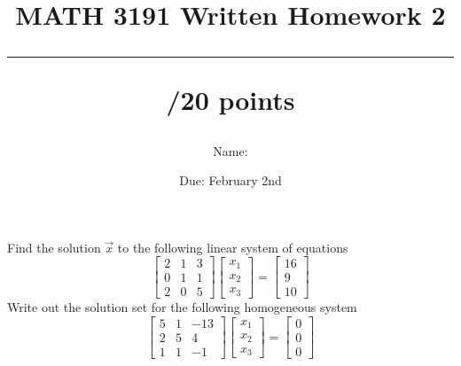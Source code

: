 \documentclass{exam}
\title{MATH 3191 Written Homework 2\\\rule{30pt}{1pt}/20 points}
\author{Name: \rule{150pt}{1pt}}
\date{Due: February 2nd}
\begin{document}
\maketitle
\begin{questions}
\question[10]
    Find the solution $\vec{x}$ to the following linear system of equations
    \[
        \begin{bmatrix}
            2 & 1 & 3\\
            0 & 1 & 1\\
            2 & 0 & 5
        \end{bmatrix}\begin{bmatrix}
            x_1 \\ x_2 \\ x_3
        \end{bmatrix} = \begin{bmatrix}
            16\\9\\10
        \end{bmatrix}
    \]
    \newpage
\question[10]
    Write out the solution set for the following homogeneous system
    \[
        \begin{bmatrix}
            5 & 1 & -13\\
            2 & 5 & 4\\
            1 & 1 & -1
        \end{bmatrix}\begin{bmatrix}
            x_1\\x_2\\x_3
        \end{bmatrix} = \begin{bmatrix}
        0\\0\\0
        \end{bmatrix}
    \]
\end{questions}
\end{document}
